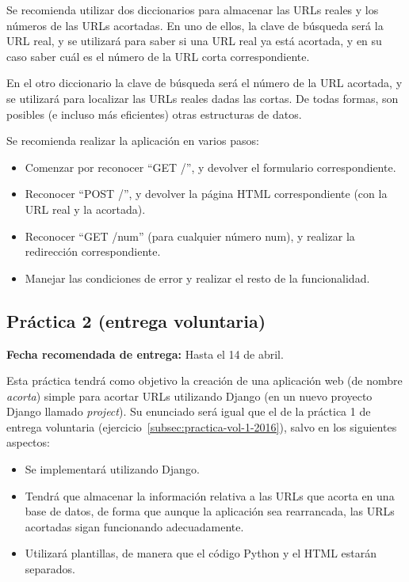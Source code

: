 Se recomienda utilizar dos diccionarios para almacenar las URLs reales y los números de las URLs acortadas. En uno de ellos, la clave de búsqueda será la URL real, y se utilizará para saber si una URL real ya está acortada, y en su caso saber cuál es el número de la URL corta correspondiente.

En el otro diccionario la clave de búsqueda será el número de la URL acortada, y se utilizará para localizar las URLs reales dadas las cortas. De todas formas, son posibles (e incluso más eficientes) otras estructuras de datos.

Se recomienda realizar la aplicación en varios pasos:

\begin{itemize}
\item Comenzar por reconocer ``GET /'', y devolver el formulario correspondiente.
\item Reconocer ``POST /'', y devolver la página HTML correspondiente (con la URL real y la acortada).
\item Reconocer ``GET /num'' (para cualquier número num), y realizar la redirección correspondiente.
\item Manejar las condiciones de error y realizar el resto de la funcionalidad.
\end{itemize}

\subsection{Práctica 2 (entrega voluntaria)}
\label{subsec:practica-vol-2-2015}

\textbf{Fecha recomendada de entrega:} Hasta el 14 de abril.

Esta práctica tendrá como objetivo la creación de una aplicación web (de nombre \emph{acorta}) simple para acortar URLs utilizando Django (en un nuevo proyecto Django llamado \emph{project}). Su enunciado será igual que el de la práctica 1 de entrega voluntaria (ejercicio~\ref{subsec:practica-vol-1-2016}), salvo en los siguientes aspectos:

\begin{itemize}
  \item Se implementará utilizando Django.
  \item Tendrá que almacenar la información relativa a las URLs que acorta en una base de datos, de forma que aunque la aplicación sea rearrancada, las URLs acortadas sigan funcionando adecuadamente.
  \item Utilizará plantillas, de manera que el código Python y el HTML estarán separados.
\end{itemize}

